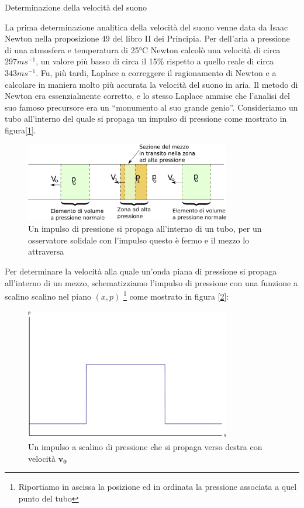 \documentclass[a4paper,10pt,twoside]{article}
\begin{document}
{\Large Determinazione della velocità del suono}

\vspace{2cm}
La prima determinazione analitica della velocità del suono venne data da Isaac Newton nella proposizione 49 del libro II dei Principia. Per dell'aria a pressione di una atmosfera e temperatura di 25°C Newton calcolò una velocità di circa $297 ms^{-1}$, un valore più basso di circa il 15\% rispetto a quello reale di circa $343ms^{-1}$. Fu, più tardi, Laplace a correggere il ragionamento di Newton e a calcolare in maniera molto più accurata la velocità del suono in aria. Il metodo di Newton era essenzialmente corretto, e lo stesso Laplace ammise che l'analisi del suo famoso precursore era un ``monumento al suo grande genio''.
Consideriamo un tubo all'interno del quale si propaga un impulso di pressione come mostrato in figura[\ref{tubo}].
\begin{figure}[h]
 \begin{center}
  \includegraphics[width=0.8\textwidth]{tubo1.png}
 \caption{Un impulso di pressione si propaga all'interno di un tubo, per un osservatore solidale con l'impulso questo è fermo e il mezzo lo attraversa}\label{tubo}
\end{center}
\end{figure}
Per determinare la velocità alla quale un'onda piana di pressione  si propaga all'interno di un mezzo, schematizziamo   l'impulso di pressione con una funzione a scalino scalino nel piano $(x,p)$ \footnote{Riportiamo in ascissa la posizione ed in ordinata la pressione associata a quel punto del tubo} come  mostrato in figura [\ref{scalino}]:
\begin{figure}[h]
\begin{center}
\includegraphics[width=0.8\textwidth]{pressione1.pdf}
\end{center}\caption{Un impulso a scalino di pressione che si propaga verso destra con velocità $\mathbf{v_0}$}\label{scalino}
\end{figure}
\end{document}
